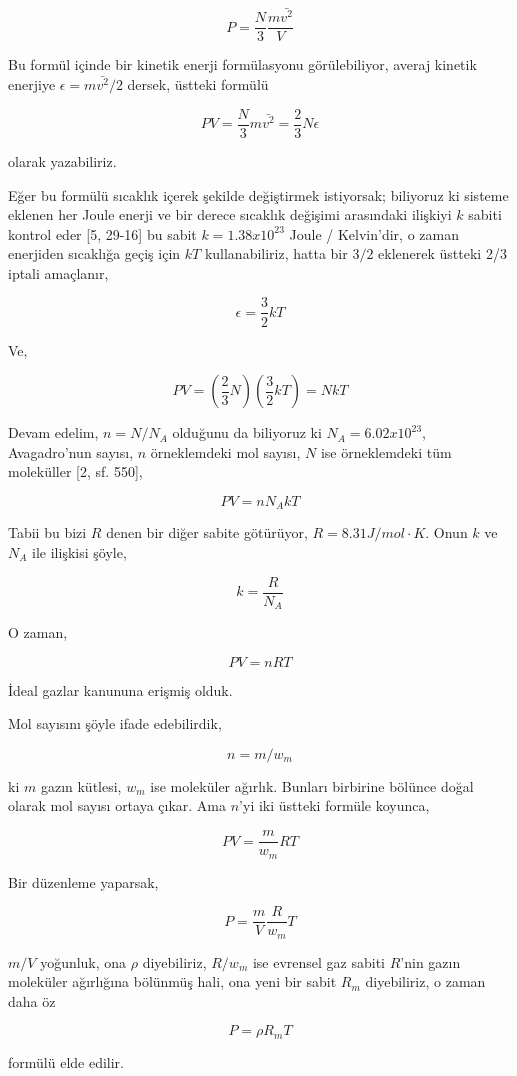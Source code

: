 \documentclass[12pt,fleqn]{article}\usepackage{../../common}
\begin{document}
$$
P = \frac{N}{3} \frac{m \bar{v^2}}{V}
$$

Bu formül içinde bir kinetik enerji formülasyonu görülebiliyor, averaj kinetik
enerjiye $\epsilon = m \bar{v^2} / 2$ dersek, üstteki formülü

$$
PV = \frac{N}{3} m \bar{v^2} = \frac{2}{3} N \epsilon
$$

olarak yazabiliriz.

Eğer bu formülü sıcaklık içerek şekilde değiştirmek istiyorsak; biliyoruz ki
sisteme eklenen her Joule enerji ve bir derece sıcaklık değişimi arasındaki
ilişkiyi $k$ sabiti kontrol eder [5, 29-16] bu sabit $k = 1.38 x 10^{23}$ Joule
/ Kelvin'dir, o zaman enerjiden sıcaklığa geçiş için $kT$ kullanabiliriz, hatta
bir $3/2$ eklenerek üstteki 2/3 iptali amaçlanır,

$$
\epsilon = \frac{3}{2} k T
$$

Ve,

$$
PV = \left( \frac{2}{3} N \right) \left( \frac{3}{2} k T \right) = N k T
$$

Devam edelim, $n = N / N_A$ olduğunu da biliyoruz ki $N_A = 6.02 x 10^{23}$,
Avagadro'nun sayısı, $n$ örneklemdeki mol sayısı, $N$ ise örneklemdeki tüm
moleküller [2, sf. 550],

$$
PV = n N_A k T
$$

Tabii bu bizi $R$ denen bir diğer sabite götürüyor, $R = 8.31 J/mol \cdot
K$. Onun $k$ ve $N_A$ ile ilişkisi şöyle,

$$
k = \frac{R}{N_A}
$$

O zaman,

$$
PV = n R T
$$

İdeal gazlar kanununa erişmiş olduk.


Mol sayısını şöyle ifade edebilirdik,

$$
n = m / w_m
$$

ki $m$ gazın kütlesi, $w_m$ ise moleküler ağırlık. Bunları birbirine bölünce
doğal olarak mol sayısı ortaya çıkar. Ama $n$'yi iki üstteki formüle koyunca,

$$
PV = \frac{m}{w_m} R T
$$

Bir düzenleme yaparsak,

$$
P = \frac{m}{V} \frac{R}{w_m} T
$$

$m/V$ yoğunluk, ona $\rho$ diyebiliriz, $R / w_m$ ise evrensel gaz
sabiti $R$'nin gazın moleküler ağırlığına bölünmüş hali, ona
yeni bir sabit $R_m$ diyebiliriz, o zaman daha öz

$$
P = \rho R_m T
$$

formülü elde edilir.
\end{document}
